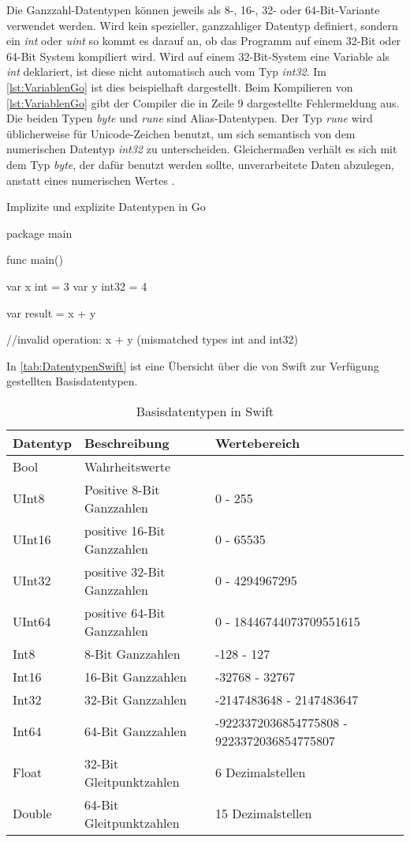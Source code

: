 Die Ganzzahl-Datentypen können jeweils als 8-, 16-, 32- oder 64-Bit-Variante verwendet werden. 
Wird kein spezieller, ganzzahliger Datentyp definiert, sondern ein \emph{int} oder \emph{uint} so kommt es darauf an, ob das Programm auf einem 32-Bit oder 64-Bit System kompiliert wird.
Wird auf einem 32-Bit-System eine Variable als \emph{int} deklariert, ist diese  nicht automatisch auch vom Typ \emph{int32}.
Im \autoref{lst:VariablenGo} ist dies beispielhaft dargestellt. 
Beim Kompilieren von \autoref{lst:VariablenGo} gibt der Compiler die in Zeile 9 dargestellte Fehlermeldung aus. 
Die beiden Typen \emph{byte} und \emph{rune} sind Alias-Datentypen.
Der Typ \emph{rune} wird üblicherweise für Unicode-Zeichen benutzt, um sich semantisch von dem numerischen Datentyp \emph{int32} zu unterscheiden. 
Gleichermaßen verhält es sich mit dem Typ \emph{byte}, der dafür benutzt werden sollte, unverarbeitete Daten abzulegen, anstatt eines numerischen Wertes \cite[S.98]{Kennedy.2016}.

\begin{listing}[H]
\caption{Implizite und explizite Datentypen in Go}
\label{lst:VariablenGo}
\begin{GoCode}
package main

func main() {
    var x int = 3
    var y int32 = 4

    var result = x + y	
}
//invalid operation: x + y (mismatched types int and int32)
\end{GoCode}
\end{listing}

In \autoref{tab:DatentypenSwift} ist eine Übersicht über die von Swift zur Verfügung gestellten Basisdatentypen. 

\begin{table}[H]
\centering
\begin{tabularx}{\textwidth}{|l|X|X|}
 \hline 
 \rowcolor[gray]{0.75} \textbf{Datentyp} & \textbf{Beschreibung} & \textbf{Wertebereich} \\
 \hline
 Bool & Wahrheitswerte & \\ 
 \hline 
 UInt8 & Positive 8-Bit Ganzzahlen & 0 - 255\\
 \hline 
 UInt16	& positive 16-Bit Ganzzahlen & 0 - 65535\\
 \hline
 UInt32 & positive 32-Bit Ganzzahlen & 0 - 4294967295\\
 \hline
 UInt64	& positive 64-Bit Ganzzahlen & 0 - 18446744073709551615\\
 \hline
 Int8 & 8-Bit Ganzzahlen & -128 - 127 \\
 \hline
 Int16 & 16-Bit Ganzzahlen & -32768 - 32767 \\
 \hline
 Int32 & 32-Bit Ganzzahlen & -2147483648 - 2147483647 \\
 \hline
 Int64 & 64-Bit Ganzzahlen & -9223372036854775808 - 9223372036854775807 \\
 \hline
 Float & 32-Bit Gleitpunktzahlen & 6 Dezimalstellen \\
 \hline 
 Double & 64-Bit Gleitpunktzahlen & 15 Dezimalstellen \\
 \hline
\end{tabularx}
\caption{Basisdatentypen in Swift}
\label{tab:DatentypenSwift}
\end{table}

